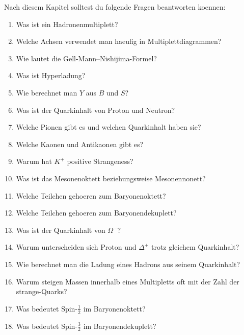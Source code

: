 \begin{examtipbox}
Nach diesem Kapitel solltest du folgende Fragen beantworten koennen:
\begin{enumerate}
    \item Was ist ein Hadronenmultiplett?
    \item Welche Achsen verwendet man haeufig in Multiplettdiagrammen?
    \item Wie lautet die Gell-Mann--Nishijima-Formel?
    \item Was ist Hyperladung?
    \item Wie berechnet man $Y$ aus $B$ und $S$?
    \item Was ist der Quarkinhalt von Proton und Neutron?
    \item Welche Pionen gibt es und welchen Quarkinhalt haben sie?
    \item Welche Kaonen und Antikaonen gibt es?
    \item Warum hat $K^+$ positive Strangeness?
    \item Was ist das Mesonenoktett beziehungsweise Mesonennonett?
    \item Welche Teilchen gehoeren zum Baryonenoktett?
    \item Welche Teilchen gehoeren zum Baryonendekuplett?
    \item Was ist der Quarkinhalt von $\Omega^-$?
    \item Warum unterscheiden sich Proton und $\Delta^+$ trotz gleichem Quarkinhalt?
    \item Wie berechnet man die Ladung eines Hadrons aus seinem Quarkinhalt?
    \item Warum steigen Massen innerhalb eines Multipletts oft mit der Zahl der strange-Quarks?
    \item Was bedeutet Spin-$\frac{1}{2}$ im Baryonenoktett?
    \item Was bedeutet Spin-$\frac{3}{2}$ im Baryonendekuplett?
\end{enumerate}
\end{examtipbox}